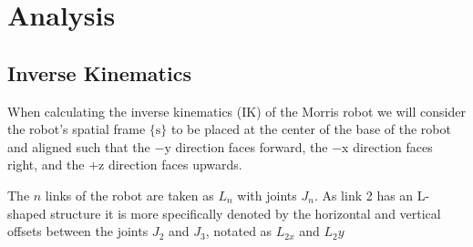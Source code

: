 \documentclass[a4paper,11pt]{article}
\begin{document}



\newpage
\section{Analysis}
\subsection{Inverse Kinematics}
When calculating the inverse kinematics (IK) of the Morris robot we will consider the robot's spatial frame $\{\mathrm{s}\}$ to be placed at the center of the base of the robot and aligned such that the $-\mathrm{y}$ direction faces forward, the $-\mathrm{x}$ direction faces right, and the $+\mathrm{z}$ direction faces upwards. 

The $n$ links of the robot are taken as $L_n$ with joints $J_n$. As link 2 has an L-shaped structure it is more specifically denoted by the horizontal and vertical offsets between the joints $J_{2}$ and $J_{3}$, notated as $L_{2x}$ and ${L_2y}$
\end{document}
